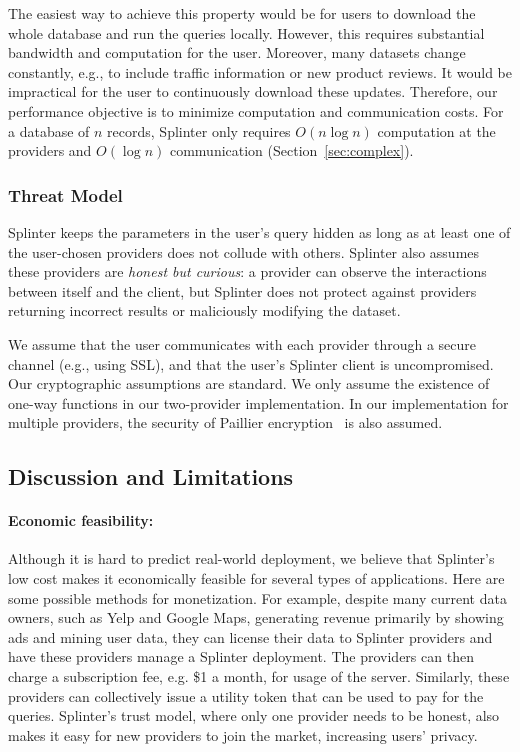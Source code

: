 The easiest way to achieve this property would be for users to download the whole database
and run the queries locally.
However, this requires substantial bandwidth and computation for the user.
Moreover, many datasets change constantly, e.g., to include traffic information or new product reviews.
It would be impractical for the user to continuously download these updates.
Therefore, our performance objective is to minimize computation and communication costs.
For a database of $n$ records, Splinter only requires $O(n \log n)$ computation at the
providers and $O(\log n)$ communication (Section~\ref{sec:complex}).

\subsubsection{Threat Model}
Splinter keeps the parameters in the user's query hidden
as long as at least one of the user-chosen providers does not collude with others. 
Splinter also assumes these providers are \textit{honest but curious}: a provider can observe the interactions between
itself and the client, but 
Splinter does not protect against providers returning incorrect results or maliciously modifying the dataset.

We assume that the user communicates with each provider through a secure channel (e.g., using SSL),
and that the user's Splinter client is uncompromised. 
Our cryptographic assumptions are standard.
We only assume the existence of one-way functions in our two-provider implementation.
In our implementation for multiple providers, the security of Paillier encryption~\cite{paillier} is also assumed.





\subsection{Discussion and Limitations}
\label{spl-sec:discussion}

\paragraph{Economic feasibility:}
\label{sec:disc-economics}

Although it is hard to predict real-world deployment, we believe that Splinter's low cost makes it economically feasible for several types of applications.
Here are some possible methods for monetization.
For example, despite many current data owners, such as Yelp and Google Maps, generating revenue primarily by showing ads and mining user data,
they can license their data to Splinter providers and have these providers manage a Splinter deployment. The providers
can then charge a subscription fee, e.g. \$1 a month, for usage of the server.
Similarly, these providers can collectively issue a utility token that
can be used to pay for the queries.
Splinter's trust model, where only one provider needs to be honest, also makes 
it easy for new providers to join the market, increasing users' privacy.

